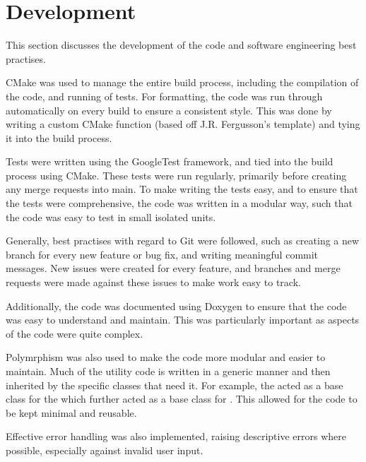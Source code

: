 
\section{Development}\label{sec:development}
    This section discusses the development of the code and software engineering best practises.

    CMake was used to manage the entire build process, including the compilation of the code, and running of tests.
    For formatting, the code was run through  automatically on every build to ensure a consistent
    style.
    This was done by writing a custom CMake function (based off J.R. Fergusson's template) and tying it into the build process.

    Tests were written using the GoogleTest framework, and tied into the build process using CMake.
    These tests were run regularly, primarily before creating any merge requests into main.
    To make writing the tests easy, and to ensure that the tests were comprehensive, the code was written in a modular
    way, such that the code was easy to test in small isolated units.

    Generally, best practises with regard to Git were followed, such as creating a new branch for every new feature
    or bug fix, and writing meaningful commit messages.
    New issues were created for every feature, and branches and merge requests were made against these issues to make
    work easy to track.

    Additionally, the code was documented using Doxygen to ensure that the code was easy to understand and maintain.
    This was particularly important as aspects of the code were quite complex.

    Polymrphism was also used to make the code more modular and easier to maintain.
    Much of the utility code is written in a generic manner and then inherited by the specific classes that need it.
    For example, the  acted as a base class for the  which further
    acted as a base class for .
    This allowed for the code to be kept minimal and reusable.

    Effective error handling was also implemented, raising descriptive errors where possible, especially against
    invalid user input.

